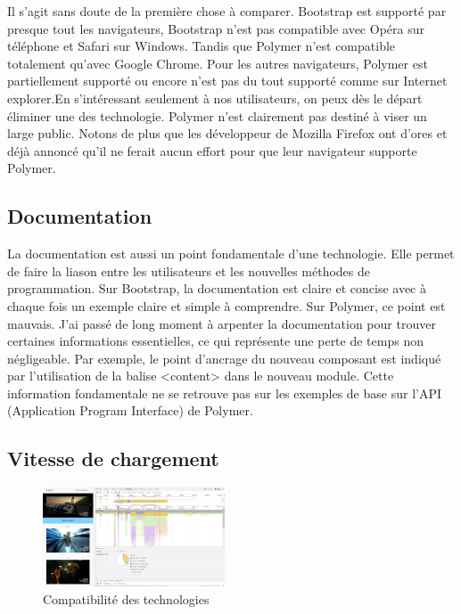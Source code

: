 \documentclass{article}
\begin{document}
Il s'agit sans doute de la premi\`ere chose \`a comparer. Bootstrap est support\'e par presque tout les navigateurs, Bootstrap n'est pas compatible avec Op\'era sur t\'el\'ephone et Safari sur Windows. Tandis que Polymer n'est compatible totalement qu'avec Google Chrome. Pour les autres navigateurs, Polymer est partiellement support\'e ou encore n'est pas du tout support\'e comme sur Internet explorer.En s'int\'eressant seulement \`a nos utilisateurs, on peux d\`es le d\'epart \'eliminer une des technologie. Polymer n'est clairement pas destin\'e \`a viser un large public. Notons de plus que les d\'eveloppeur de Mozilla Firefox ont d'ores et d\'ej\`a annonc\'e qu'il ne ferait aucun effort pour que leur navigateur supporte Polymer.\\

\subsection{Documentation}

La documentation est aussi un point fondamentale d'une technologie. Elle permet de faire la liason entre les utilisateurs et les nouvelles m\'ethodes de programmation. Sur Bootstrap, la documentation est claire et concise avec \`a chaque fois un exemple claire et simple \`a comprendre. Sur Polymer, ce point est mauvais. J'ai pass\'e de long moment \`a arpenter la documentation pour trouver certaines informations essentielles, ce qui repr\'esente une perte de temps non n\'egligeable. Par exemple, le point d'ancrage du nouveau composant est indiqu\'e par l'utilisation de la balise <content> dans le nouveau module. Cette information fondamentale ne se retrouve pas sur les exemples de base sur l'API (Application Program Interface) de Polymer.

\subsection{Vitesse de chargement}

\begin{figure}
  \vspace{-25pt}
  \begin{center}
    \includegraphics[width=0.48\textwidth]{p15}
  \end{center}
  \vspace{-20pt}
  \caption{Compatibilit\'e des technologies}
  \vspace{-10pt}
\end{figure}
\end{document}
